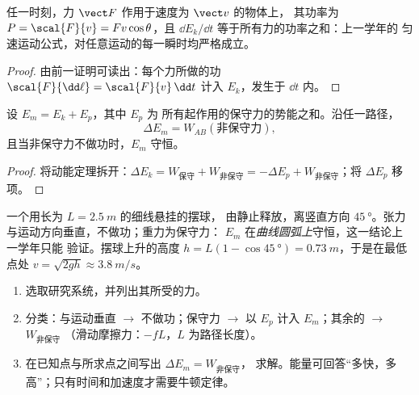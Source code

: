 \begin{proposition}[瞬时功率]\label{prop:g12:work-and-energy:power}
任一时刻，力 $\vect F$ 作用于速度为 $\vect v$ 的物体上，
其功率为 $P = \scal{F}{v} = Fv\cos\theta$，且
$\dd E_k/\dd t$ 等于所有力的功率之和：上一学年的
匀速运动公式，对任意运动的每一瞬时均严格成立。
\end{proposition}

\begin{proof}
由前一证明可读出：每个力所做的功
$\scal{F}{\dd\ell} = \scal{F}{v}\,\dd t$ 计入 $E_k$，发生于 $\dd t$ 内。
\end{proof}

\begin{theorem}[机械能定理]\label{thm:g12:work-and-energy:emtheorem}
设 $E_m = E_k + E_p$，其中 $E_p$ 为
所有起作用的保守力的势能之和。沿任一路径，
\[
\Delta E_m = W_{AB}(\text{非保守力}),
\]
且当非保守力不做功时，$E_m$ 守恒。
\end{theorem}

\begin{proof}
将动能定理拆开：$\Delta E_k = W_{\text{保守}} +
W_{\text{非保守}} = -\Delta E_p + W_{\text{非保守}}$；将 $\Delta E_p$ 移项。
\end{proof}

\begin{example}[单摆，这次认真算一算]\label{ex:g12:work-and-energy:pendulum}
一个用长为 $L = \qty{2.5}{m}$ 的细线悬挂的摆球，
由静止释放，离竖直方向 $\qty{45}{\degree}$。张力
与运动方向垂直，不做功；重力为保守力：
$E_m$ 在\emph{曲线圆弧上}守恒，这一结论上一学年只能
验证。摆球上升的高度 $h = L(1 - \cos\qty{45}{\degree}) =
\qty{0.73}{m}$，于是在最低点处 $v = \sqrt{2gh} \approx
\qty{3.8}{m/s}$。
\end{example}

\begin{method}[任意运动的能量分析]\label{met:g12:work-and-energy:audit}
\begin{enumerate}
  \item 选取研究系统，并列出其所受的力。
  \item 分类：与运动垂直 $\to$ 不做功；保守力
        $\to$ 以 $E_p$ 计入 $E_m$；其余的 $\to$ $W_{\text{非保守}}$
        （滑动摩擦力：$-fL$，$L$ 为路径长度）。
  \item 在已知点与所求点之间写出 $\Delta E_m = W_{\text{非保守}}$，
        求解。能量可回答“多快，多
        高”；只有时间和加速度才需要牛顿定律。
\end{enumerate}
\end{method}

